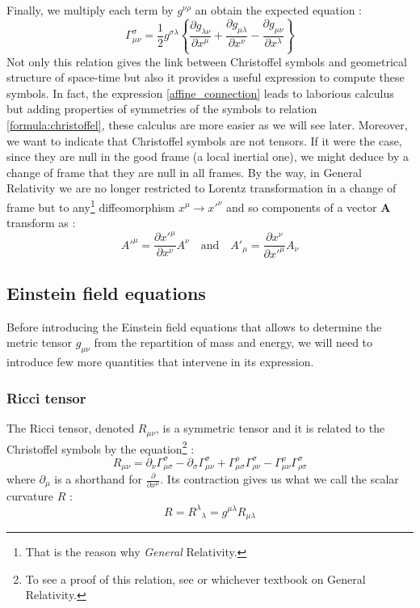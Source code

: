 %
Finally, we multiply each term by $g^{\nu\rho}$ an obtain the expected equation :
%
\begin{equation}\label{formula:christoffel}
	\Gamma^\sigma_{\mu\nu} =
	\frac{1}{2}g^{\sigma\lambda}\left\{\frac{\partial g_{\lambda\nu}}{\partial x^\mu}
	+ \frac{\partial g_{\mu\lambda}}{\partial x^\nu}
	- \frac{\partial g_{\mu\nu}}{\partial x^\lambda}\right\}
\end{equation}
%
Not only this relation gives the link between Christoffel symbols and geometrical structure
of space-time but also it provides a useful expression to compute these symbols. In fact, the
expression \eqref{affine_connection} leads to laborious calculus but adding properties
of symmetries of the symbols to relation \eqref{formula:christoffel}, these calculus are more easier as we will see later.
Moreover, we want to indicate that Christoffel symbols are not tensors. If it were the case,
since they are null in the good frame (a local inertial one), we might deduce by a change of frame
that they are null in all frames. By the way, in General Relativity we are no longer restricted to Lorentz transformation
in a change of frame but to any\footnote{That is the reason why \textit{General} Relativity.} diffeomorphism
$x^\mu \rightarrow {x'}^\nu$ and so components of a vector $\textbf{A}$ transform as :
%
\begin{equation}
 {A'}^\mu = \frac{\partial {x'}^\mu}{\partial x^\nu} A^\nu \quad \mathrm{and} \quad {A'}_\mu = \frac{\partial x^\nu}{\partial {x'}^\mu} A_\nu
\end{equation}

\subsection{Einstein field equations}

Before introducing the Einstein field equations that allows to determine the metric tensor $g_{\mu\nu}$ from the repartition of mass
and energy, we will need to introduce few more quantities that intervene in its expression.

\subsubsection{Ricci tensor}

The Ricci tensor, denoted $R_{\mu\nu}$, is a symmetric tensor and it is related to the Christoffel symbols by the
equation\footnote{To see a proof of this relation, see \cite{weinberg1972gravitation}
or whichever textbook on General Relativity.} :
%
\begin{equation}
 R_{\mu\nu}=\partial_\nu \Gamma^{\sigma}_{\mu\sigma}-
\partial_\sigma\Gamma^{\sigma}_{\mu\nu}+
\Gamma^{\rho}_{\mu\sigma}\Gamma^{\sigma}_{\rho\nu}
-\Gamma^{\rho}_{\mu\nu}\Gamma^{\sigma}_{\rho\sigma}
\end{equation}
%
where $\partial_\mu$ is a shorthand for $\frac{\partial}{\partial x^\mu}$.
Its contraction gives us what we call the scalar curvature $R$ :
%
\begin{equation}
 R = {R^\lambda}_\lambda = g^{\mu\lambda}R_{\mu\lambda}
\end{equation}
%

